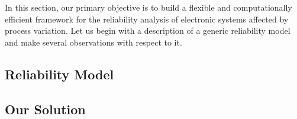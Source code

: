 In this section, our primary objective is to build a flexible and computationally efficient framework for the reliability analysis of electronic systems affected by process variation.
Let us begin with a description of a generic reliability model and make several observations with respect to it.

\subsection{Reliability Model} 


\subsection{Our Solution} 



